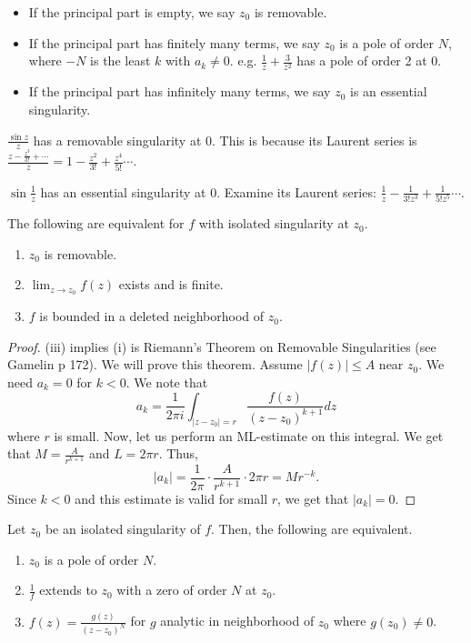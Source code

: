 \documentclass[11pt,leqno,oneside]{amsart}
\numberwithin{thm}{section}
\begin{document}
  \begin{itemize}
  \item If the principal part is empty, we say $z_0$ is removable.
  \item If the principal part has finitely many terms, we say $z_0$ is
    a pole of order $N$, where $-N$ is the least $k$ with $a_k \neq
    0$. e.g. $\frac{1}{z}+\frac{3}{z^2}$ has a pole of order 2 at 0.
  \item If the principal part has infinitely many terms, we say $z_0$
    is an essential singularity.
  \end{itemize}
  \begin{example}
    $\frac{\sin z}{z}$ has a removable singularity at 0. This is
    because its Laurent series is $\frac{z-\frac{z^3}{3!}+\cdots}{z} =
    1-\frac{z^2}{3!}+\frac{z^4}{5!}\cdots$.
  \end{example}
  \begin{example}
    $\sin \frac{1}{z}$ has an essential singularity at 0. Examine its
    Laurent series: $\frac{1}{z}-\frac{1}{3!z^3}+\frac{1}{5!z^5}\cdots$.
  \end{example}
  \begin{prop}
    The following are equivalent for $f$ with isolated singularity at
    $z_0$.
    \begin{enumerate}[label=(\roman*)]
    \item $z_0$ is removable.
    \item $\lim_{z \to z_0} f(z)$ exists and is finite.
    \item $f$ is bounded in a deleted neighborhood of $z_0$.
    \end{enumerate}
  \end{prop}
  \begin{proof}
    (iii) implies (i) is Riemann's Theorem on Removable Singularities
    (see Gamelin p 172). We will prove this theorem. Assume $|f(z)|
    \leq A$ near $z_0$. We need $a_k = 0$ for $k < 0$. We note that \[
      a_k = \frac{1}{2 \pi i}\int_{|z-z_0|=r} \frac{f(z)}{(z-z_0)^{k+1}}dz
    \]
    where $r$ is small. Now, let us perform an ML-estimate on this
    integral. We get that $M = \frac{A}{r^{k+1}}$ and $L = 2\pi
    r$. Thus, \[
      |a_k| = \frac{1}{2\pi} \cdot \frac{A}{r^{k+1}} \cdot 2 \pi r = Mr^{-k}.
    \]
    Since $k < 0$ and this estimate is valid for small $r$, we get
    that $|a_k| = 0$.
  \end{proof}
  \begin{lem}
    Let $z_0$ be an isolated singularity of $f$. Then, the following
    are equivalent.
    \begin{enumerate}[label=(\roman*)]
    \item $z_0$ is a pole of order $N$.
    \item $\frac{1}{f}$ extends to $z_0$ with a zero of order $N$ at
      $z_0$.
    \item $f(z) = \frac{g(z)}{(z-z_0)^N}$ for $g$ analytic in
      neighborhood of $z_0$ where $g(z_0) \neq 0$.
    \end{enumerate}
  \end{lem}
\end{document}
